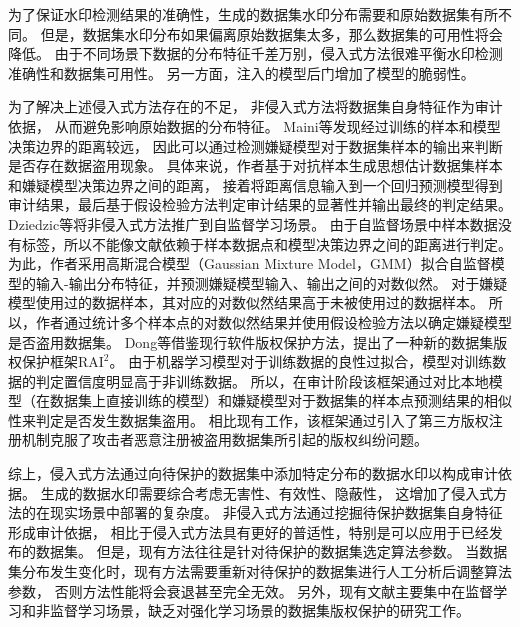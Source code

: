 为了保证水印检测结果的准确性，生成的数据集水印分布需要和原始数据集有所不同。
但是，数据集水印分布如果偏离原始数据集太多，那么数据集的可用性将会降低。
由于不同场景下数据的分布特征千差万别，侵入式方法很难平衡水印检测准确性和数据集可用性。
另一方面，注入的模型后门增加了模型的脆弱性\cite{DBLP:journals/corr/abs-2210-00875}。

为了解决上述侵入式方法存在的不足，
非侵入式方法将数据集自身特征作为审计依据，
从而避免影响原始数据的分布特征。
Maini等\cite{DBLP:conf/iclr/MainiYP21}发现经过训练的样本和模型决策边界的距离较远，
因此可以通过检测嫌疑模型对于数据集样本的输出来判断是否存在数据盗用现象。
具体来说，作者基于对抗样本生成思想\cite{DBLP:journals/corr/SzegedyZSBEGF13}估计数据集样本和嫌疑模型决策边界之间的距离，
接着将距离信息输入到一个回归预测模型得到审计结果，最后基于假设检验方法判定审计结果的显著性并输出最终的判定结果。
Dziedzic等\cite{DBLP:journals/corr/abs-2209-09024}将非侵入式方法推广到自监督学习场景。
由于自监督场景中样本数据没有标签，所以不能像文献{\rm\parencite{DBLP:journals/corr/SzegedyZSBEGF13}}依赖于样本数据点和模型决策边界之间的距离进行判定。
为此，作者采用高斯混合模型（Gaussian Mixture Model，GMM）拟合自监督模型的输入-输出分布特征，并预测嫌疑模型输入、输出之间的对数似然。
对于嫌疑模型使用过的数据样本，其对应的对数似然结果高于未被使用过的数据样本。
所以，作者通过统计多个样本点的对数似然结果并使用假设检验方法以确定嫌疑模型是否盗用数据集。
Dong等\cite{DBLP:conf/ndss/DongLCXZ023}借鉴现行软件版权保护方法，提出了一种新的数据集版权保护框架$\text{RAI}^2$。
由于机器学习模型对于训练数据的良性过拟合\cite{DBLP:conf/iclr/SanyalDKT21, DBLP:journals/jmlr/ChatterjiL21, bartlett2020benign}，模型对训练数据的判定置信度明显高于非训练数据。
所以，在审计阶段该框架通过对比本地模型（在数据集上直接训练的模型）和嫌疑模型对于数据集的样本点预测结果的相似性来判定是否发生数据集盗用。
相比现有工作，该框架通过引入了第三方版权注册机制克服了攻击者恶意注册被盗用数据集所引起的版权纠纷问题。

综上，侵入式方法通过向待保护的数据集中添加特定分布的数据水印以构成审计依据。
生成的数据水印需要综合考虑无害性、有效性、隐蔽性，
这增加了侵入式方法的在现实场景中部署的复杂度。
非侵入式方法通过挖掘待保护数据集自身特征形成审计依据，
相比于侵入式方法具有更好的普适性，特别是可以应用于已经发布的数据集。
但是，现有方法往往是针对待保护的数据集选定算法参数。
当数据集分布发生变化时，现有方法需要重新对待保护的数据集进行人工分析后调整算法参数，
否则方法性能将会衰退甚至完全无效。
另外，现有文献主要集中在监督学习和非监督学习场景，缺乏对强化学习场景的数据集版权保护的研究工作。


